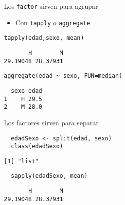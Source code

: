 \documentclass[xcolor={usenames,svgnames,dvipsnames}]{beamer}
\begin{document}
\begin{frame}[fragile,label=sec-1-4]{Los \texttt{factor} sirven para agrupar}
 \begin{itemize}
\item Con \texttt{tapply} o \texttt{aggregate}
\end{itemize}
\lstset{language=R,label= ,caption= ,numbers=none}
\begin{lstlisting}
tapply(edad,sexo, mean)
\end{lstlisting}

\begin{verbatim}
       H        M 
29.19048 28.37931
\end{verbatim}

\lstset{language=R,label= ,caption= ,numbers=none}
\begin{lstlisting}
aggregate(edad ~ sexo, FUN=median)
\end{lstlisting}

\begin{verbatim}
  sexo edad
1    H 29.5
2    M 28.0
\end{verbatim}
\end{frame}

\begin{frame}[fragile,label=sec-1-5]{Los factores sirven para separar}
 \lstset{language=R,label= ,caption= ,numbers=none}
\begin{lstlisting}
  edadSexo <- split(edad, sexo)
  class(edadSexo)
\end{lstlisting}

\begin{verbatim}
[1] "list"
\end{verbatim}

\lstset{language=R,label= ,caption= ,numbers=none}
\begin{lstlisting}
  sapply(edadSexo, mean)
\end{lstlisting}

\begin{verbatim}
       H        M 
29.19048 28.37931
\end{verbatim}
\end{frame}
\end{document}

